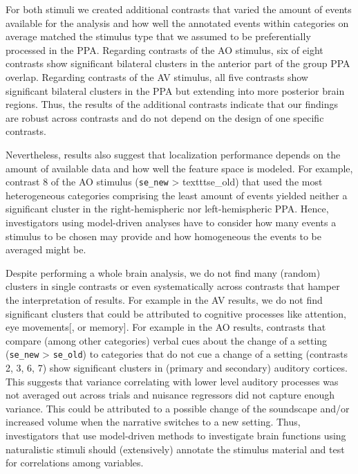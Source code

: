 \documentclass[english]{article}
\begin{document}
For both stimuli we created additional contrasts that varied the amount of
events available for the analysis and how well the annotated events within
categories on average matched the stimulus type that we assumed to be
preferentially processed in the PPA.
Regarding contrasts of the AO stimulus, six of eight contrasts show significant
bilateral clusters in the anterior part of the group PPA overlap.
Regarding contrasts of the AV stimulus, all five contrasts show significant
bilateral clusters in the PPA but extending into more posterior brain regions.
Thus, the results of the additional contrasts indicate that our findings are
robust across contrasts and do not depend on the design of one specific
contrasts.

Nevertheless, results also suggest that localization performance depends on the
amount of available data and how well the feature space is modeled.
For example, contrast 8 of the AO stimulus (\texttt{se\_new} > texttt{se\_old})
that used the most heterogeneous categories comprising the least amount of
events yielded neither a significant cluster in the right-hemispheric nor
left-hemispheric PPA.
Hence, investigators using model-driven analyses have to consider how many
events a stimulus to be chosen may provide and how homogeneous the events to be
averaged might be.

Despite performing a whole brain analysis, we do not find many (random) clusters
in single contrasts or even systematically across contrasts that hamper the
interpretation of results.
For example in the AV results, we do not find significant clusters that could be
attributed to cognitive processes like attention, eye movements[, or
memory].
For example in the AO results, contrasts that compare (among other categories)
verbal cues about the change of a setting (\texttt{se\_new} > \texttt{se\_old})
to categories that do not cue a change of a setting (contrasts 2, 3, 6, 7) show
significant clusters in (primary and secondary) auditory cortices.
This suggests that variance correlating with lower level auditory processes was
not averaged out across trials and nuisance regressors did not capture enough
variance.
This could be attributed to a possible change of the soundscape and/or increased
volume when the narrative switches to a new setting.
Thus, investigators that use model-driven methods to investigate brain functions
using naturalistic stimuli should (extensively) annotate the stimulus material
and test for correlations among variables.
\end{document}

